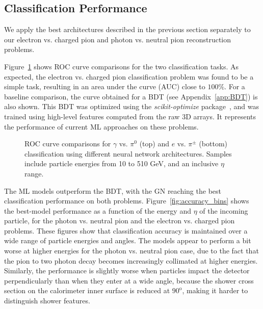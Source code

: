 \subsection{Classification Performance}
\label{sec:classification}

We apply the best architectures described in the previous section separately to our electron vs. charged pion and photon vs. neutral pion reconstruction problems.

Figure~\ref{fig:architectures_ROC_comparisons} shows ROC curve comparisons for the two classification tasks. As expected, the electron vs. charged pion classification problem was found to be a simple task, resulting in an area under the curve (AUC) close to $100\%$. For a baseline comparison, the curve obtained for a BDT (see Appendix~\ref{app:BDT}) is also shown. This BDT was optimized using the {\it scikit-optimize} package~\cite{skopt}, and was trained using high-level features computed from the raw 3D arrays. It represents the performance of current ML approaches on these problems.

\begin{figure}[htbp]
\centering
\caption{ROC curve comparisons for $\gamma$ vs. $\pi^0$ (top) and $e$ vs. $\pi^\pm$ (bottom) classification using different neural network architectures. Samples include particle energies from 10 to 510 GeV, and an inclusive $\eta$ range.}
\label{fig:architectures_ROC_comparisons}
\end{figure}

The ML models outperform the BDT, with the GN reaching the best classification performance on both problems. Figure~\ref{fig:accuracy_bins} shows the best-model performance as a function of the energy and $\eta$ of the incoming particle, for the photon vs. neutral pion and the electron vs. charged pion problems. These figures show that classification accuracy is maintained over a wide range of particle energies and angles. The models appear to perform a bit worse at higher energies for the photon vs. neutral pion case, due to the fact that the pion to two photon decay becomes increasingly collimated at higher energies. Similarly, the performance is slightly worse when particles impact the detector perpendicularly than when they enter at a wide angle, because the shower cross section on the calorimeter inner surface is reduced at $90^{\mathrm o}$, making it harder to distinguish shower features.

